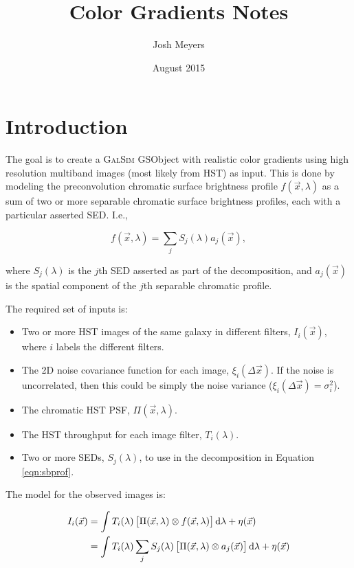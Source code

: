 \documentclass{article}
\title{Color Gradients Notes}
\author{Josh Meyers}
\date{August 2015}
\begin{document}
\section{Introduction}

The goal is to create a \textsc{GalSim} GSObject with realistic color gradients using high
resolution multiband images (most likely from HST) as input.  This is done by modeling the
preconvolution chromatic surface brightness profile $f(\vec{x}, \lambda)$ as a sum of two or more
separable chromatic surface brightness profiles, each with a particular asserted SED.  I.e.,

\begin{equation}
    \label{eqn:sbprof}
    f(\vec{x}, \lambda) = \sum_j S_j(\lambda) a_j(\vec{x}),
\end{equation}

where $S_j(\lambda)$ is the $j$th SED asserted as part of the decomposition, and $a_j(\vec{x})$ is
the spatial component of the $j$th separable chromatic profile.

The required set of inputs is:

\begin{itemize}

\item Two or more HST images of the same galaxy in different filters, $I_i(\vec{x})$, where $i$
labels the different filters.

\item The 2D noise covariance function for each image, $\xi_i(\Delta\vec{x})$.  If the noise is
uncorrelated, then this could be simply the noise variance ($\xi_i(\Delta\vec{x}) = \sigma^2_i$).

\item The chromatic HST PSF, $\Pi(\vec{x}, \lambda)$.

\item The HST throughput for each image filter, $T_i(\lambda)$.

\item Two or more SEDs, $S_j(\lambda)$, to use in the decomposition in Equation \ref{eqn:sbprof}.

\end{itemize}

The model for the observed images is:

\begin{align}
    I_i(\vec{x})
    &= \int T_i(\lambda) \left[\Pi(\vec{x}, \lambda) \otimes f(\vec{x}, \lambda)\right] \dif{\lambda} + \eta(\vec{x}) \\
    &= \int T_i(\lambda) \sum_j S_j(\lambda) \left[\Pi(\vec{x}, \lambda) \otimes a_j(\vec{x})\right] \dif{\lambda} + \eta(\vec{x})
\end{align}
\end{document}
